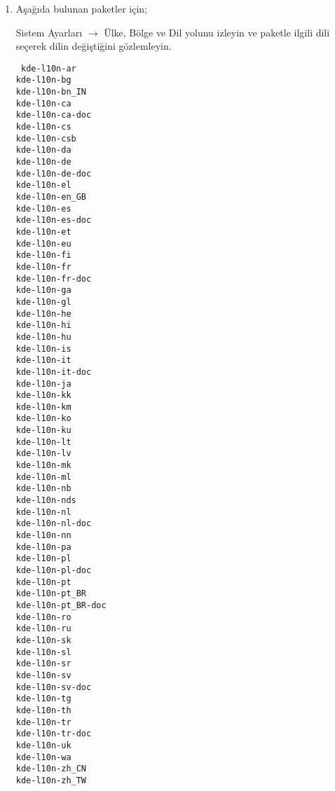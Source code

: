 \documentclass[a4paper,10pt]{article}
\begin{document}
\begin{enumerate} 
 \item Aşağıda bulunan paketler için; 

Sistem Ayarları $\rightarrow$ Ülke, Bölge ve Dil yolunu izleyin ve paketle ilgili dili seçerek dilin değiştiğini gözlemleyin. 

\begin{verbatim}
 kde-l10n-ar
kde-l10n-bg
kde-l10n-bn_IN
kde-l10n-ca
kde-l10n-ca-doc
kde-l10n-cs
kde-l10n-csb
kde-l10n-da
kde-l10n-de
kde-l10n-de-doc
kde-l10n-el
kde-l10n-en_GB
kde-l10n-es
kde-l10n-es-doc
kde-l10n-et
kde-l10n-eu
kde-l10n-fi
kde-l10n-fr
kde-l10n-fr-doc
kde-l10n-ga
kde-l10n-gl
kde-l10n-he
kde-l10n-hi
kde-l10n-hu
kde-l10n-is
kde-l10n-it
kde-l10n-it-doc
kde-l10n-ja
kde-l10n-kk
kde-l10n-km
kde-l10n-ko
kde-l10n-ku
kde-l10n-lt
kde-l10n-lv
kde-l10n-mk
kde-l10n-ml
kde-l10n-nb
kde-l10n-nds
kde-l10n-nl
kde-l10n-nl-doc
kde-l10n-nn
kde-l10n-pa
kde-l10n-pl
kde-l10n-pl-doc
kde-l10n-pt
kde-l10n-pt_BR
kde-l10n-pt_BR-doc
kde-l10n-ro
kde-l10n-ru
kde-l10n-sk
kde-l10n-sl
kde-l10n-sr
kde-l10n-sv
kde-l10n-sv-doc
kde-l10n-tg
kde-l10n-th
kde-l10n-tr
kde-l10n-tr-doc
kde-l10n-uk
kde-l10n-wa
kde-l10n-zh_CN
kde-l10n-zh_TW
\end{verbatim}

\end{enumerate}
\end{document}
